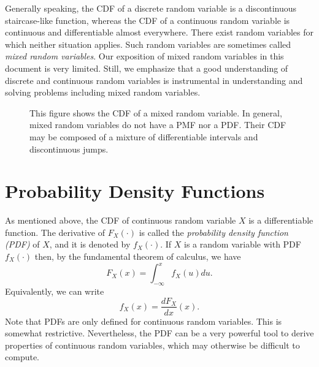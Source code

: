 Generally speaking, the CDF of a discrete random variable is a discontinuous staircase-like function, whereas the CDF of a continuous random variable is continuous and differentiable almost everywhere.
There exist random variables for which neither situation applies.
Such random variables are sometimes called \emph{mixed random variables}. 
Our exposition of mixed random variables in this document is very limited.
Still, we emphasize that a good understanding of discrete and continuous random variables is instrumental in understanding and solving problems including mixed random variables.

\begin{figure}[ht]
\begin{center}
\end{center}
\caption{This figure shows the CDF of a mixed random variable.
In general, mixed random variables do not have a PMF nor a PDF.
Their CDF may be composed of a mixture of differentiable intervals and discontinuous jumps.}
\end{figure}


\section{Probability Density Functions}

As mentioned above, the CDF of continuous random variable $X$ is a differentiable function.
The derivative of $F_X (\cdot)$ is called the \emph{probability density function (PDF)} of $X$, and it is denoted by $f_X(\cdot)$. 
If $X$ is a random variable with PDF $f_X (\cdot)$ then, by the fundamental theorem of calculus, we have
\begin{equation*}
F_X (x) = \int_{- \infty}^x f_X (u) du .
\end{equation*}
Equivalently, we can write
\begin{equation*}
f_X (x) = \frac{d F_X}{dx} (x) .
\end{equation*}
Note that PDFs are only defined for continuous random variables.
This is somewhat restrictive.
Nevertheless, the PDF can be a very powerful tool to derive properties of continuous random variables, which may otherwise be difficult to compute.

